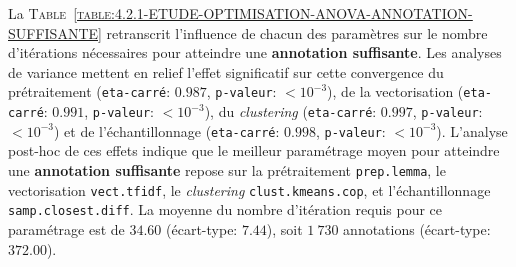 			La \textsc{Table~\ref{table:4.2.1-ETUDE-OPTIMISATION-ANOVA-ANNOTATION-SUFFISANTE}} retranscrit l'influence de chacun des paramètres sur le nombre d'itérations nécessaires pour atteindre une \textbf{annotation suffisante}.
			Les analyses de variance mettent en relief l'effet significatif sur cette convergence du prétraitement (\texttt{eta-carré}: $0.987$, \texttt{p-valeur}: $< 10^{-3}$), de la vectorisation (\texttt{eta-carré}: $0.991$, \texttt{p-valeur}: $< 10^{-3}$), du \textit{clustering} (\texttt{eta-carré}: $0.997$, \texttt{p-valeur}: $< 10^{-3}$) et de l'échantillonnage (\texttt{eta-carré}: $0.998$, \texttt{p-valeur}: $< 10^{-3}$).
			L'analyse post-hoc de ces effets indique que le meilleur paramétrage moyen pour atteindre une \textbf{annotation suffisante} repose sur la prétraitement \texttt{prep.lemma}, le vectorisation \texttt{vect.tfidf}, le \textit{clustering} \texttt{clust.kmeans.cop}, et l'échantillonnage \texttt{samp.closest.diff}. La moyenne du nombre d'itération requis pour ce paramétrage est de $34.60$ (écart-type: $7.44$), soit $1~730$ annotations (écart-type: $372.00$).
